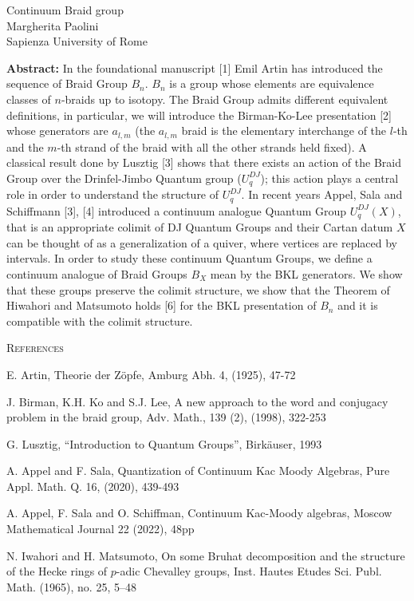 \documentclass[12pt,a4paper]{article}
\begin{document}
\thispagestyle{empty} 
\begin{center}
{\large Continuum Braid group}\\
\vspace*{.5cm}
Margherita Paolini\\
Sapienza University of Rome\\
\end{center}
\vspace*{.8cm}

{\bf Abstract:} In the foundational manuscript [1] Emil Artin has introduced the
sequence of Braid Group $B_n$. $B_n$ is a group whose elements are equivalence classes of $n$-braids up to isotopy. The Braid Group admits different equivalent definitions, in particular, we will introduce the Birman-Ko-Lee presentation [2] whose generators are $a_{l,m}$ (the $a_{l,m}$ braid is the elementary interchange of the
$l$-th and the $m$-th strand of the braid with all the other strands held fixed). A classical result done by Lusztig [3] shows that there exists an action of the Braid Group over the Drinfel-Jimbo Quantum group ($U_q^{DJ}$); this action plays a central role in order to understand the structure of $U_q^{DJ}$. In recent years Appel, Sala and Schiffmann [3], [4] introduced a continuum analogue Quantum Group $U_q^{DJ}(X)$, that is an appropriate colimit of DJ Quantum Groups and their Cartan datum $X$ can be thought of as a generalization of a quiver, where vertices are replaced by intervals. In order to study these continuum Quantum Groups, we define a continuum analogue of Braid Groups $B_X$ mean by the BKL generators. We show that these groups preserve the colimit structure, we show that the Theorem of Hiwahori and Matsumoto holds [6] for the BKL presentation of $B_n$ and it is compatible with the colimit structure.

\bigskip
\textsc{References}

\begin{enumerate}[label={[\arabic*]}]
\item E. Artin, Theorie der Z\"opfe, Amburg Abh. 4, (1925), 47-72
\item J. Birman, K.H. Ko and S.J. Lee, A new approach to the word and conjugacy
problem in the braid group, Adv. Math., 139 (2), (1998), 322-253
\item  G. Lusztig, “Introduction to Quantum Groups”, Birk\"auser, 1993
\item A. Appel and F. Sala, Quantization of Continuum Kac Moody Algebras, Pure Appl. Math. Q. 16, (2020), 439-493
\item A. Appel, F. Sala and O. Schiffman, Continuum Kac-Moody algebras, Moscow Mathematical Journal 22 (2022), 48pp
\item N. Iwahori and H. Matsumoto, On some Bruhat decomposition and the structure of the Hecke rings of $p$-adic Chevalley groups, Inst. Hautes Etudes Sci. Publ. Math. (1965), no. 25, 5–48
\end{enumerate}
\end{document}
